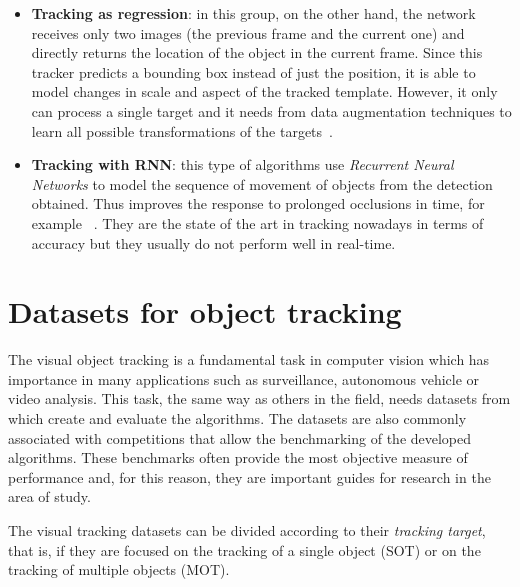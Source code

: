 \begin{itemize}
\item \textbf{Tracking as regression}: in this group, on the other hand, the network receives only two images (the previous frame and the current one) and directly returns the location of the object in the current frame. Since this tracker predicts a bounding box instead of just the position, it is able to model changes in scale and aspect of the tracked template. However, it only can process a single target and it needs from data augmentation techniques to learn all possible transformations of the targets~\cite{held2016learning}.
\item \textbf{Tracking with RNN}: this type of algorithms use \textit{Recurrent Neural Networks} to model the sequence of movement of objects from the detection obtained. Thus improves the response to prolonged occlusions in time, for example ~\cite{sadeghian2017tracking}. They are the state of the art in tracking nowadays in terms of accuracy but they usually do not perform well in real-time.
\end{itemize}
\section{Datasets for object tracking}
The visual object tracking is a fundamental task in computer vision which has importance in many applications such as surveillance, autonomous vehicle or video analysis. This task, the same way as others in the field, needs datasets from which create and evaluate the algorithms. The datasets are also commonly associated with competitions that allow the benchmarking of the developed algorithms. These benchmarks often provide the most objective measure of performance and, for this reason, they are important guides for research in the area of study.

The visual tracking datasets can be divided according to their \textit{tracking target}, that is, if they are focused on the tracking of a single object (SOT) or on the tracking of multiple objects (MOT).
